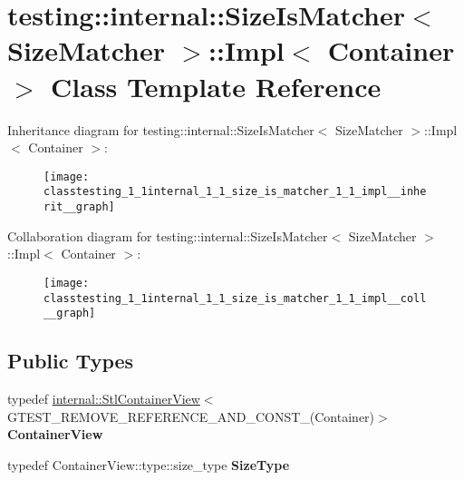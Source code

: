 \hypertarget{classtesting_1_1internal_1_1_size_is_matcher_1_1_impl}{}\section{testing\+:\+:internal\+:\+:Size\+Is\+Matcher$<$ Size\+Matcher $>$\+:\+:Impl$<$ Container $>$ Class Template Reference}
\label{classtesting_1_1internal_1_1_size_is_matcher_1_1_impl}


Inheritance diagram for testing\+:\+:internal\+:\+:Size\+Is\+Matcher$<$ Size\+Matcher $>$\+:\+:Impl$<$ Container $>$\+:
\nopagebreak
\begin{figure}[H]
\begin{center}
\leavevmode
\texttt{[image: classtesting\_1\_1internal\_1\_1\_size\_is\_matcher\_1\_1\_impl\_\_inherit\_\_graph]}
\end{center}
\end{figure}


Collaboration diagram for testing\+:\+:internal\+:\+:Size\+Is\+Matcher$<$ Size\+Matcher $>$\+:\+:Impl$<$ Container $>$\+:
\nopagebreak
\begin{figure}[H]
\begin{center}
\leavevmode
\texttt{[image: classtesting\_1\_1internal\_1\_1\_size\_is\_matcher\_1\_1\_impl\_\_coll\_\_graph]}
\end{center}
\end{figure}
\subsection*{Public Types}
\begin{DoxyCompactItemize}
\item 
\mbox{\label{classtesting_1_1internal_1_1_size_is_matcher_1_1_impl_ae848755998eaaaa5e38366a2fc8b55e2}} 
typedef \hyperlink{classtesting_1_1internal_1_1_stl_container_view}{internal\+::\+Stl\+Container\+View}$<$ G\+T\+E\+S\+T\+\_\+\+R\+E\+M\+O\+V\+E\+\_\+\+R\+E\+F\+E\+R\+E\+N\+C\+E\+\_\+\+A\+N\+D\+\_\+\+C\+O\+N\+S\+T\+\_\+(Container)$>$ {\bfseries Container\+View}
\item 
\mbox{\label{classtesting_1_1internal_1_1_size_is_matcher_1_1_impl_a5548da0c4c2245ca2fb520f44f0a687a}} 
typedef Container\+View\+::type\+::size\+\_\+type {\bfseries Size\+Type}
\end{DoxyCompactItemize}
